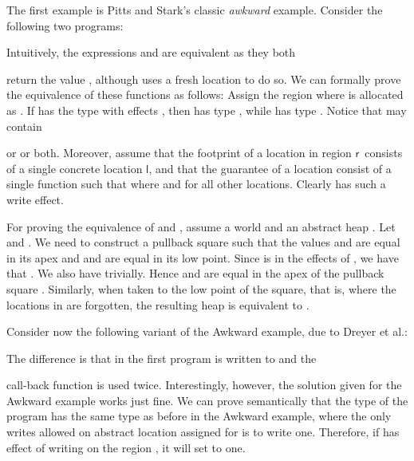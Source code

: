 \documentclass[orivec]{llncs}
\newif\iffull\fullfalse
\renewcommand{\paragraph}[1]{\noindent {\bf #1}}
\newcommand{\regid}{\ensuremath{\mathsf{r}}}
\newcommand{\cloc}{\ensuremath{\mathsf{l}}\xspace}
\begin{document}
\paragraph{Awkward Example}
 The first example is Pitts and Stark's classic \emph{awkward}
example\cite{pitts98high}. Consider the
following two programs:
\iffull

Intuitively, the expressions  and  are equivalent as they both
\else



\noindent
Intuitively, the expressions  and  are equivalent as they both
\fi
return the value , although  uses a fresh location to do so.
We can formally prove the equivalence of these functions as follows:
Assign the region where  is allocated as . If  has the type
 with effects , then  has 
type , while 
 has type . Notice that   may contain

or  or both. Moreover,
assume that the footprint of a location in
region \regid\ consists of a single concrete location \cloc, and that the
guarantee of a location  consist of a single function
 such that  where
 and  for all other
locations. Clearly  has such a write effect.

For proving the equivalence of  and , assume a world  and an
abstract heap . Let  and . We need to construct a pullback square  such that the values 
and  are equal in its apex and  and  are equal
in its low point. Since  is in the effects of , we
have that . We also have  trivially. Hence
 and  are equal in the apex of the pullback square . Similarly,  when
taken to the low point of the square, that is, where the locations in
 are forgotten, the resulting heap is equivalent to .


\paragraph{Modified Awkward Example} 
Consider now the following variant of the Awkward example, due to
Dreyer et al.\cite{dreyer10icfp}:
\iffull

The difference is that in the first program  is written to  and the
\else



\noindent
The difference is that in the first program  is written to  and the
\fi
call-back function is used twice. Interestingly, however, the solution
given for the Awkward example works just fine. We can prove semantically
that the type of the program  has the same type as before in the
Awkward example, where the only writes allowed on abstract location
assigned for  is to write one.
Therefore, if  has effect of writing on the region , it will set
 to one.
\end{document}
